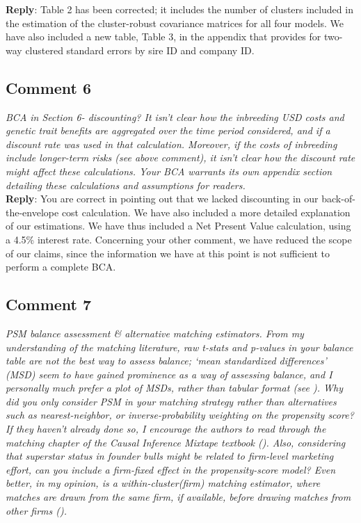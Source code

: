 \documentclass[12pt,letterpaper]{article}
\begin{document}
\textbf{Reply}: Table 2 has been corrected; it includes the number of clusters included in the estimation of the cluster-robust covariance matrices for all four models. We have also included a new table, Table 3, in the appendix that provides for two-way clustered standard errors by sire ID and company ID.

\subsection*{Comment 6}
{\it
BCA in Section 6- discounting? It isn’t clear how the inbreeding USD costs and
genetic trait benefits are aggregated over the time period considered, and if a
discount rate was used in that calculation. Moreover, if the costs of inbreeding
include longer-term risks (see above comment), it isn’t clear how the discount rate
might affect these calculations. Your BCA warrants its own appendix section
detailing these calculations and assumptions for readers.} \\

\textbf{Reply}: You are correct in pointing out that we lacked discounting in our back-of-the-envelope cost calculation. We have also included a more detailed explanation of our estimations. We have thus included a Net Present Value calculation, using a 4.5\% interest rate. Concerning your other comment, we have reduced the scope of our claims, since the information we have at this point is not sufficient to perform a complete BCA. 

\subsection*{Comment 7}
{\it PSM balance assessment \& alternative matching estimators. From my
understanding of the matching literature, raw t-stats and p-values in your balance table are not the best way to assess balance; ‘mean standardized differences’ (MSD) seem to have gained prominence as a way of assessing balance, and I personally much prefer a plot of MSDs, rather than tabular format (see \cite{Greifer2025}). Why did you only consider PSM in your matching strategy rather than alternatives such as nearest-neighbor, or inverse-probability weighting on the propensity score? If they haven’t already done so, I encourage the authors to read through the matching chapter of the Causal Inference Mixtape textbook (\cite{Cunningham2021}). Also, considering that superstar status in founder bulls might be related to firm-level marketing effort, can you include a firm-fixed effect in the propensity-score model? Even better, in my opinion, is a within-cluster(firm) matching estimator, where matches are drawn from the same firm, if available, before drawing matches from other firms (\cite{Arpino2016}).} \\
\end{document}
